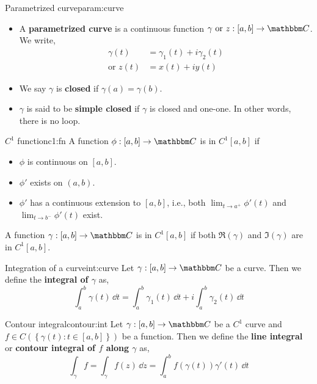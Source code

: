 \documentclass[../ComplexAnalysis_Notes.tex]{subfiles}
\begin{document}
\begin{Def}{Parametrized curve}{param:curve}
  \begin{itemize}
    \item A \textbf{parametrized curve} is a continuous function \(\gamma \text{ or } z : [a, b] \to \C\). We write,
          \begin{align*}
            \gamma(t)       & = \gamma_1(t) + i \gamma_2(t) \\
            \text{or } z(t) & = x(t) + iy(t)
          \end{align*}
    \item We say \(\gamma\) is \textbf{closed} if \(\gamma(a) = \gamma(b)\).
    \item \(\gamma\) is said to be \textbf{simple closed} if \(\gamma\) is closed and one-one. In other words, there is no loop.
  \end{itemize}
\end{Def}

\begin{Def}{\(C^1\) function}{c1:fn}
  A function \(\phi : [a, b] \to \C\) is in \(C^1[a, b]\) if
  \begin{itemize}
    \item \(\phi\) is continuous on \([a, b]\).
    \item \(\phi'\) exists on \((a, b)\).
    \item \(\phi'\) has a continuous extension to \([a, b]\), i.e., both \(\lim_{t \to a^+} \phi'(t)\) and \(\lim_{t \to b^-} \phi'(t)\) exist.
  \end{itemize}
\end{Def}

\begin{Def}{}{}
  A function \(\gamma : [a, b] \to \C\) is in \(C^1[a, b]\) if both \(\Re(\gamma)\) and \(\Im(\gamma)\) are in \(C^1[a, b]\).
\end{Def}

\begin{Def}{Integration of a curve}{int:curve}
  Let \(\gamma : [a, b] \to \C\) be a curve. Then we define the \textbf{integral of \(\gamma\)} as,
  \[
    \int_a^b \gamma(t) \, \dd{t} = \int_a^b \gamma_1(t) \, \dd{t} + i \int_a^b \gamma_2(t) \, \dd{t}
  \]
\end{Def}

\begin{Def}{Contour integral}{contour:int}
  Let \(\gamma : [a, b] \to \C\) be a \(C^1\) curve and \(f \in C\left( \left\{ \gamma(t) : t \in [a, b] \right\} \right)\) be a function. Then we define the \textbf{line integral} or \textbf{contour integral of \(f\) along \(\gamma\)} as,
  \[
    \int_\gamma f = \int_\gamma f(z) \, \dd{z} = \int_a^b f(\gamma(t)) \gamma'(t) \, \dd{t}
  \]
\end{Def}
\end{document}
